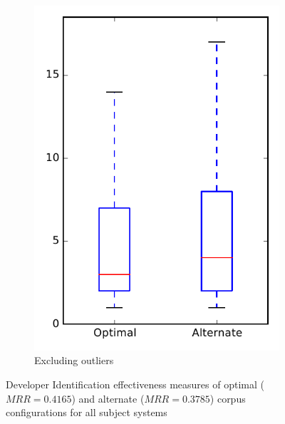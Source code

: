 \begin{figure}
\begin{subfigure}{.4\textwidth}
        \includegraphics[height=0.4\textheight]{figures/combo/dit_rq2_all_no_outlier}
        \caption{Excluding outliers}\label{fig:combo:dit:rq2:all_no_outlier}
    \end{subfigure}
\caption[Developer Identification effectiveness measures of optimal and alternate corpus configurations for all subject systems]%
{Developer Identification effectiveness measures of optimal ($MRR=0.4165$) and alternate ($MRR=0.3785$) corpus configurations for all subject systems}
\label{fig:combo:dit:rq2:all}
\end{figure}
